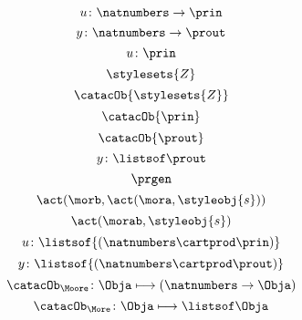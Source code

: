 {\begin{forslides}
\begin{equation}
            \label{eq:prgen-u-1}
            u\colon \natnumbers \to \prin
        \end{equation}
        \begin{equation}
            \label{eq:prgen-y-1}
            y\colon \natnumbers \to \prout
        \end{equation}
        \begin{equation}
            \label{eq:prgen-u-2}
            u\colon \prin
        \end{equation}
        \begin{equation}
            \label{eq:Z}
            \stylesets{Z}
        \end{equation}
        \begin{equation}
            \label{eq:Za}
            \catacOb{\stylesets{Z}}
        \end{equation}
        \begin{equation}
            \label{eq:Ua}
            \catacOb{\prin}
        \end{equation}
        \begin{equation}
            \label{eq:Ya}
            \catacOb{\prout}
        \end{equation}
        \begin{equation}
            \label{eq:prgen-y-2}
            y\colon \listsof  \prout
        \end{equation}
        \begin{equation}
            \label{eq:prgen}
            \prgen
        \end{equation}
        \begin{equation}
            \label{eq:now1}
            \act(\morb, \act(\mora, \styleobj{s}))
        \end{equation}
        \begin{equation}
            \label{eq:now2}
            \act(\morab, \styleobj{s})
        \end{equation}
        \begin{equation}
            \label{eq:ev-sign}
            u\colon \listsof{(\natnumbers \cartprod \prin)}
        \end{equation}
        \begin{equation}
            \label{eq:ev-sign2}
            y\colon \listsof{(\natnumbers \cartprod \prout)}
        \end{equation}
        \begin{equation}
            \label{eq:phi-moore}
            {\catacOb_{\Moore}}\colon{\Obja}\longmapsto{(\natnumbers \to \Obja)}
        \end{equation}
        \begin{equation}
            \label{eq:phi-more}
            {\catacOb_{\More}}\colon{\Obja}\longmapsto{\listsof \Obja}
        \end{equation}
    \end{forslides}
}
